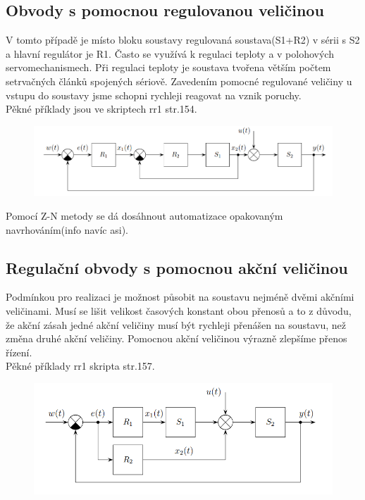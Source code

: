 \subsection*{Obvody s pomocnou regulovanou veličinou}
V tomto případě je místo bloku soustavy regulovaná soustava(S1+R2) v sérii s S2 a hlavní regulátor je R1. Často se využívá k regulaci teploty a v polohových servomechanismech. Při regulaci teploty je soustava tvořena větším počtem setrvačných článků spojených sériově. Zavedením pomocné regulované veličiny u vstupu do soustavy jsme schopni rychleji reagovat na vznik poruchy. \\
Pěkné příklady jsou ve skriptech rr1 str.154.
\begin{figure}[H]
    \includegraphics*[scale = 1]{images/pomocnaRegulace.png}
\end{figure}
Pomocí Z-N metody se dá dosáhnout automatizace opakovaným navrhováním(info navíc asi).\\

\subsection*{Regulační obvody s pomocnou akční veličinou}
Podmínkou pro realizaci je možnost působit na soustavu nejméně dvěmi akčními veličinami. Musí se lišit velikost časových konstant obou přenosů a to z důvodu, že akční zásah jedné akční veličiny musí být rychleji přenášen na soustavu, než změna druhé akční veličiny. Pomocnou akční veličinou výrazně zlepšíme přenos řízení.\\
Pěkné příklady rr1 skripta str.157.
\begin{figure}[H]
    \includegraphics*[scale = 1]{images/pomocnaAkcniVelicina.png}
\end{figure}

